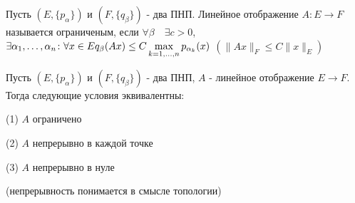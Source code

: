 \documentclass[a4paper,12pt]{report}
\begin{document}
\begin{df}
Пусть $(E,\{p_\alpha\})$ и $(F,\{q_\beta\})$ - два ПНП. Линейное отображение $A\colon E\to F$ называется ограниченым, если $\forall\beta\quad\exists c>0$, $\exists\alpha_1,\ldots,\alpha_n\colon\forall {x\in E}\\ q_\beta(Ax)\le C\max\limits_{k=1,\ldots,n}p_{\alpha_k}(x)$  $(\|Ax\|_F\le C\|x\|_E)$
\end{df}
 


\begin{thm}
Пусть $(E,\{p_\alpha\})$ и $(F,\{q_\beta\})$ - два ПНП, $A$ - линейное отображение $E\to F$. Тогда следующие условия эквивалентны:

(1) $A$ ограничено

(2) $A$ непрерывно в каждой точке

(3) $A$ непрерывно в нуле 

(непрерывность понимается в смысле топологии)
\end{thm}
\end{document}
